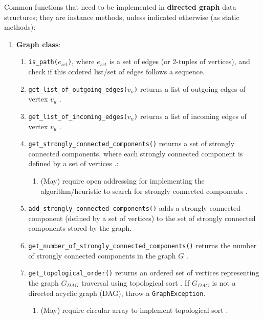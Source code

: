 Common functions that need to be implemented in {\bf directed graph} data structures; they are instance methods, unless indicated otherwise (as static methods):
\begin{enumerate}
\item {\bf Graph class}: \vspace{-0.3cm}
	\begin{enumerate} \itemsep -2pt
	\item {\tt is\_path($e_{set}$)}, where $e_{set}$ is a set of edges (or 2-tuples of vertices), and check if this ordered list/set of edges follows a sequence.
	\item {\tt get\_list\_of\_outgoing\_edges($v_{u}$)} returns a list of outgoing edges of vertex $v_{u}$ \cite[\S52.4, pp. 849; \S52.5, pp. 851]{Goldman2008}.
	\item {\tt get\_list\_of\_incoming\_edges($v_{u}$)} returns a list of incoming edges of vertex $v_{u}$ \cite[\S52.4, pp. 849; \S52.5, pp. 851]{Goldman2008}.
	\item {\tt get\_strongly\_connected\_components()} returns a set of strongly connected components, where each strongly connected component is defined by a set of vertices \cite[\S52.4, pp. 850]{Goldman2008}.: \vspace{-0.2cm}
		\begin{enumerate} \itemsep -2pt
		\item (May) require open addressing for implementing the algorithm/heuristic to search for strongly connected components \cite[\S53, pp. 857]{Goldman2008}.
		\end{enumerate}
	\item {\tt add\_strongly\_connected\_components()} adds a strongly connected component (defined by a set of vertices) to the set of strongly connected components stored by the graph. %
	\item {\tt get\_number\_of\_strongly\_connected\_components()} returns the number of strongly connected components in the graph $G$ \cite[\S52.4, pp. 850]{Goldman2008}.
	\item {\tt get\_topological\_order()} returns an ordered set of vertices representing the graph $G_{DAG}$ traversal using topological sort \cite[\S52.4, pp. 850]{Goldman2008}. If  $G_{DAG}$ is not a directed acyclic graph (DAG), throw a {\tt GraphException}. \vspace{-0.2cm}
		\begin{enumerate} \itemsep -2pt
		\item (May) require circular array to implement topological sort \cite[\S53, pp. 857]{Goldman2008}.

\end{enumerate}
\end{enumerate}
\end{enumerate}
